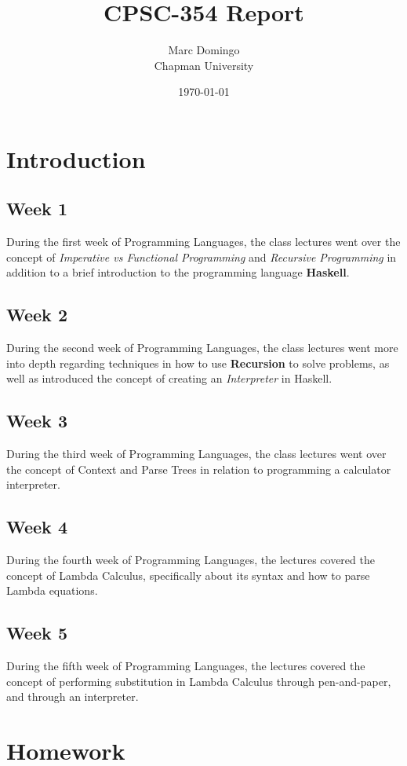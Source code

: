 \documentclass{article}
\title{CPSC-354 Report}
\author{Marc Domingo  \\ Chapman University}
\date{\today}
\theoremstyle{theorem}
\theoremstyle{definition}
\theoremstyle{remark}
\begin{document}
\maketitle
\tableofcontents

\section{Introduction}\label{introduction}
\subsection{Week 1}
\hspace{10mm} During the first week of Programming Languages, the class lectures went over the concept of \textit{Imperative vs Functional Programming} and \textit{Recursive Programming} in addition to a brief introduction to the programming language \textbf{Haskell}.
\subsection{Week 2}
\hspace{10mm} During the second week of Programming Languages, the class lectures went more into depth regarding techniques in how to use \textbf{Recursion} to solve problems, as well as introduced the concept of creating an \textit{Interpreter} in Haskell.
\subsection{Week 3} During the third week of Programming Languages, the class lectures went over the concept of Context and Parse Trees in relation to programming a calculator interpreter.
\subsection{Week 4} During the fourth week of Programming Languages, the lectures covered the concept of Lambda Calculus, specifically about its syntax and how to parse Lambda equations.
\subsection{Week 5} During the fifth week of Programming Languages, the lectures covered the concept of performing substitution in Lambda Calculus through pen-and-paper, and through an interpreter.
\section{Homework}\label{homework}
\end{document}
